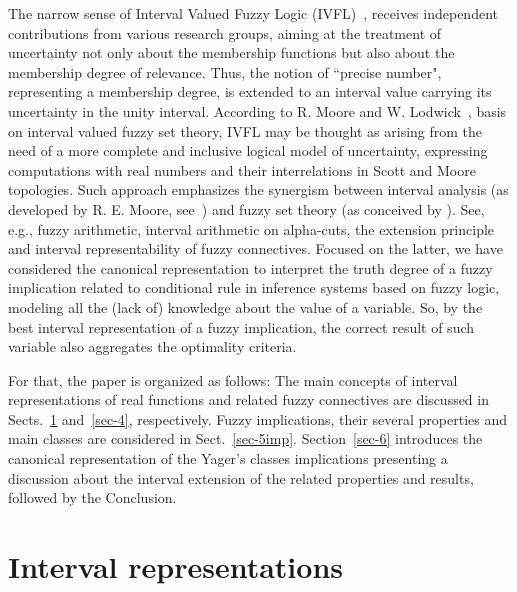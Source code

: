 \documentclass[12pt]{article}
\theoremstyle{plain}
\theoremstyle{remark}
\theoremstyle{definition}
\theoremstyle{proposition}
\begin{document}
The narrow sense of Interval Valued Fuzzy Logic (IVFL)~\cite{Zad75}, receives independent contributions from various research groups, aiming at the treatment of uncertainty not only about the membership functions but also about the membership degree of relevance. Thus, the notion of ``precise number", representing a membership degree, is extended to an interval value carrying its uncertainty in the unity interval.
According to R. Moore and W. Lodwick~\cite{Lod02}, basis on interval valued fuzzy set theory, IVFL may be thought
as arising from the need of a more complete and inclusive logical model of uncertainty, expressing computations with real numbers and their interrelations in Scott and Moore topologies. Such approach emphasizes the synergism between interval analysis (as developed by R. E. Moore, see~\cite{Moo79, Moo03,keafort}) and fuzzy set theory (as conceived by \cite{Zad65}). See, e.g., fuzzy arithmetic, interval arithmetic on alpha-cuts, the extension principle and interval representability of fuzzy connectives. Focused on the latter, we have considered the canonical representation to interpret the truth degree of a fuzzy implication related to conditional rule in inference systems based on fuzzy logic, modeling all the (lack of) knowledge about the value of a variable. So, by the best interval representation of a fuzzy implication, the correct result of such variable also aggregates the optimality criteria\cite{Hic01}.



For that, the paper is organized as follows: The main concepts of interval representations of real functions and related fuzzy connectives are discussed in Sects.~\ref{sec-3} and~\ref{sec-4}, respectively. Fuzzy implications, their several properties and main classes are considered in Sect.~\ref{sec-5imp}. Section~\ref{sec-6} introduces the canonical representation of the Yager's classes implications presenting a discussion about the interval extension of the related properties and results, followed by the Conclusion.

\section{Interval representations}\label{sec-3}

%
\end{document}
